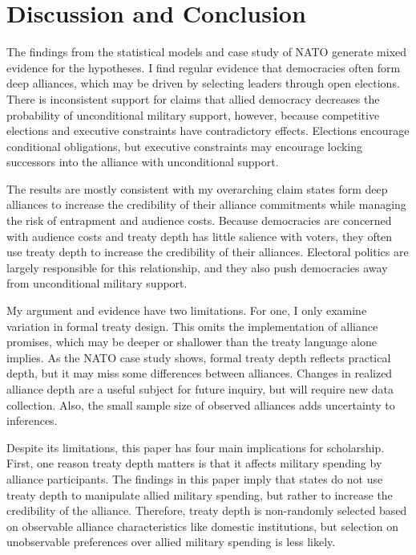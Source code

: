 \documentclass[12pt]{article}
\begin{document}
\section{Discussion and Conclusion}


The findings from the statistical models and case study of NATO generate mixed evidence for the hypotheses. 
I find regular evidence that democracies often form deep alliances, which may be driven by selecting leaders through open elections.  
There is inconsistent support for claims that allied democracy decreases the probability of unconditional military support, however, because competitive elections and executive constraints have contradictory effects. 
Elections encourage conditional obligations, but executive constraints may encourage locking successors into the alliance with unconditional support. 


The results are mostly consistent with my overarching claim states form deep alliances to increase the credibility of their alliance commitments while managing the risk of entrapment and audience costs. 
Because democracies are concerned with audience costs and treaty depth has little salience with voters, they often use treaty depth to increase the credibility of their alliances.
Electoral politics are largely responsible for this relationship, and they also push democracies away from unconditional military support. 


My argument and evidence have two limitations. 
For one, I only examine variation in formal treaty design. 
This omits the implementation of alliance promises, which may be deeper or shallower than the treaty language alone implies. 
As the NATO case study shows, formal treaty depth reflects practical depth, but it may miss some differences between alliances. 
Changes in realized alliance depth are a useful subject for future inquiry, but will require new data collection.
Also, the small sample size of observed alliances adds uncertainty to inferences.  


Despite its limitations, this paper has four main implications for scholarship. 
First, one reason treaty depth matters is that it affects military spending by alliance participants.
The findings in this paper imply that states do not use treaty depth to manipulate allied military spending, but rather to increase the credibility of the alliance. 
Therefore, treaty depth is non-randomly selected based on observable alliance characteristics like domestic institutions, but selection on unobservable preferences over allied military spending is less likely. 
\end{document}
